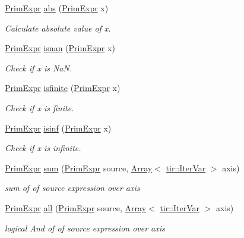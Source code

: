 \begin{DoxyCompactItemize}
\hyperlink{classtvm_1_1PrimExpr}{Prim\+Expr} \hyperlink{namespacetvm_a84d274191adb24d2acb39064c1fbec52}{abs} (\hyperlink{classtvm_1_1PrimExpr}{Prim\+Expr} x)
\begin{DoxyCompactList}\small\item\em Calculate absolute value of x. \end{DoxyCompactList}\item 
\hyperlink{classtvm_1_1PrimExpr}{Prim\+Expr} \hyperlink{namespacetvm_a8f98d60fdc4526b07c8858d6b0b8d1ee}{isnan} (\hyperlink{classtvm_1_1PrimExpr}{Prim\+Expr} x)
\begin{DoxyCompactList}\small\item\em Check if x is NaN. \end{DoxyCompactList}\item 
\hyperlink{classtvm_1_1PrimExpr}{Prim\+Expr} \hyperlink{namespacetvm_a6a48a2b96c995f412390db3ea3b38bd9}{isfinite} (\hyperlink{classtvm_1_1PrimExpr}{Prim\+Expr} x)
\begin{DoxyCompactList}\small\item\em Check if x is finite. \end{DoxyCompactList}\item 
\hyperlink{classtvm_1_1PrimExpr}{Prim\+Expr} \hyperlink{namespacetvm_a30e728d87aa70f76d7f4a09316c9746d}{isinf} (\hyperlink{classtvm_1_1PrimExpr}{Prim\+Expr} x)
\begin{DoxyCompactList}\small\item\em Check if x is infinite. \end{DoxyCompactList}\item 
\hyperlink{classtvm_1_1PrimExpr}{Prim\+Expr} \hyperlink{namespacetvm_a5cea5eb708bfbfa08e285092e5afdc33}{sum} (\hyperlink{classtvm_1_1PrimExpr}{Prim\+Expr} source, \hyperlink{classtvm_1_1Array}{Array}$<$ \hyperlink{classtvm_1_1tir_1_1IterVar}{tir\+::\+Iter\+Var} $>$ axis)
\begin{DoxyCompactList}\small\item\em sum of of source expression over axis \end{DoxyCompactList}\item 
\hyperlink{classtvm_1_1PrimExpr}{Prim\+Expr} \hyperlink{namespacetvm_a78bab31ca3c44dbd5e6801e1e223d475}{all} (\hyperlink{classtvm_1_1PrimExpr}{Prim\+Expr} source, \hyperlink{classtvm_1_1Array}{Array}$<$ \hyperlink{classtvm_1_1tir_1_1IterVar}{tir\+::\+Iter\+Var} $>$ axis)
\begin{DoxyCompactList}\small\item\em logical And of of source expression over axis \end{DoxyCompactList}\item 

\end{DoxyCompactItemize}
